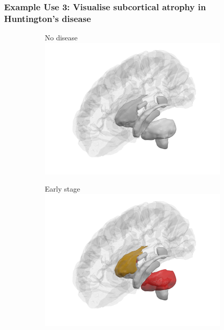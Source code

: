 \documentclass[10pt,xcolor=table,aspectratio=169]{beamer}
\begin{document}
\begin{frame}
 \frametitle{Example Use 3: Visualise subcortical atrophy in Huntington's disease}
\begin{figure}[htp]
\centering
\begin{subfigure}{0.2\textwidth}
\centering
No disease
\includegraphics[width=1\textwidth,trim=70 0 70 0, clip]{images/ebmhd_pngs/subcortical_stage0.png}
\end{subfigure}
\begin{subfigure}{0.2\textwidth}
\centering
Early stage
\includegraphics[width=1\textwidth,trim=70 0 70 0, clip]{images/ebmhd_pngs/subcortical_stage3.png}

\end{subfigure}
\end{figure}
\end{frame}
\end{document}
